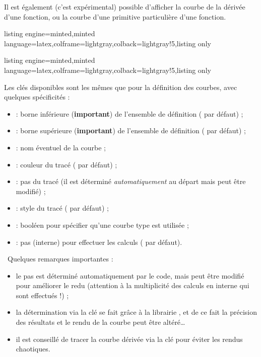 \documentclass[11pt,a4paper]{ltxdoc}
\begin{document}
Il est également (c'est expérimental) possible d'afficher la courbe de la dérivée d'une fonction, ou la courbe d'une primitive particulière d'une fonction.

\begin{tcblisting}{listing engine=minted,minted language=latex,colframe=lightgray,colback=lightgray!5,listing only}
\end{tcblisting}

\begin{tcblisting}{listing engine=minted,minted language=latex,colframe=lightgray,colback=lightgray!5,listing only}
\end{tcblisting}

Les clés disponibles sont les mêmes que pour la définition des courbes, avec quelques spécificités :

\begin{itemize}
  \item {} : borne inférieure (\textbf{important}) de l'ensemble de définition ( par défaut) ;
  \item {} : borne supérieure (\textbf{important}) de l'ensemble de définition ( par défaut) ;
  \item {} : nom éventuel de la courbe ;
  \item {} : couleur du tracé ( par défaut) ;
  \item {} : pas du tracé (il est déterminé \textit{automatiquement} au départ mais peut être modifié) ;
  \item {} : style du tracé ( par défaut) ;
  \item {} : booléen pour spécifier qu'une courbe type \MontreCode{[Spline]} est utilisée ;
  \item {} : pas (interne) pour effectuer les calculs ( par défaut).
\end{itemize}

{\footnotesize\faBomb}~Quelques remarques importantes :

\begin{itemize}
  \item le pas  est déterminé automatiquement par le code, mais peut être modifié pour améliorer le redu (attention à la multiplicité des calculs en interne qui sont effectués !) ;
  \item la détermination via la clé \MontreCode{[Spline]} se fait grâce à la librairie , et de ce fait la précision des résultats et le rendu de la courbe peut être altéré\ldots
  \item il est conseillé de tracer la courbe dérivée via la clé \MontreCode{[StyleTrace=dashed]} pour éviter les rendus chaotiques.
\end{itemize}
\end{document}
